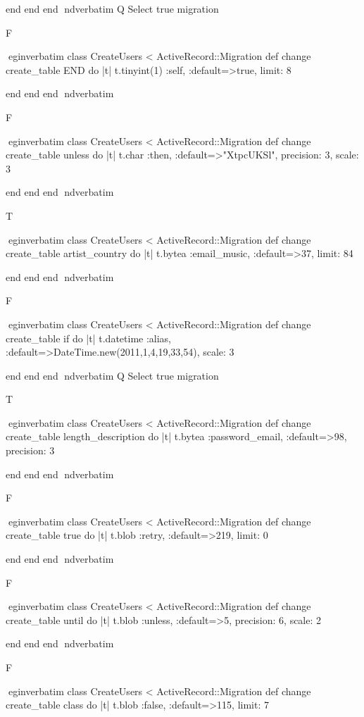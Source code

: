     end 
  end 
end
nd{verbatim}
Q
 Select true migration

F

egin{verbatim}
 class CreateUsers < ActiveRecord::Migration 
  def change 
    create_table END do |t| 
      t.tinyint(1) :self, :default=>true, limit: 8
    
    end 
  end 
end
nd{verbatim}

F

egin{verbatim}
 class CreateUsers < ActiveRecord::Migration 
  def change 
    create_table unless do |t| 
      t.char :then, :default=>"XtpcUKSl", precision: 3, scale: 3
    
    end 
  end 
end
nd{verbatim}

T

egin{verbatim}
 class CreateUsers < ActiveRecord::Migration 
  def change 
    create_table artist_country do |t| 
      t.bytea :email_music, :default=>37, limit: 84
    
    end 
  end 
end
nd{verbatim}

F

egin{verbatim}
 class CreateUsers < ActiveRecord::Migration 
  def change 
    create_table if do |t| 
      t.datetime :alias, :default=>DateTime.new(2011,1,4,19,33,54), scale: 3
    
    end 
  end 
end
nd{verbatim}
Q
 Select true migration

T

egin{verbatim}
 class CreateUsers < ActiveRecord::Migration 
  def change 
    create_table length_description do |t| 
      t.bytea :password_email, :default=>98, precision: 3
    
    end 
  end 
end
nd{verbatim}

F

egin{verbatim}
 class CreateUsers < ActiveRecord::Migration 
  def change 
    create_table true do |t| 
      t.blob :retry, :default=>219, limit: 0
    
    end 
  end 
end
nd{verbatim}

F

egin{verbatim}
 class CreateUsers < ActiveRecord::Migration 
  def change 
    create_table until do |t| 
      t.blob :unless, :default=>5, precision: 6, scale: 2
    
    end 
  end 
end
nd{verbatim}

F

egin{verbatim}
 class CreateUsers < ActiveRecord::Migration 
  def change 
    create_table class do |t| 
      t.blob :false, :default=>115, limit: 7
    
